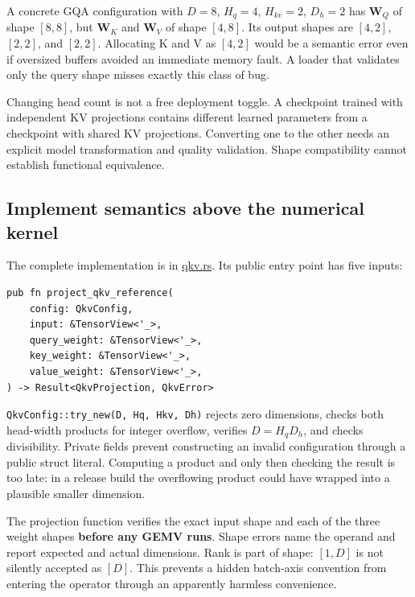 \documentclass[
  10pt,
]{article}
\begin{document}
A concrete GQA configuration with \(D=8\), \(H_q=4\), \(H_{kv}=2\),
\(D_h=2\) has \(\mathbf{W}_Q\) of shape \([8,8]\), but \(\mathbf{W}_K\)
and \(\mathbf{W}_V\) of shape \([4,8]\). Its output shapes are
\([4,2]\), \([2,2]\), and \([2,2]\). Allocating K and V as \([4,2]\)
would be a semantic error even if oversized buffers avoided an immediate
memory fault. A loader that validates only the query shape misses
exactly this class of bug.

Changing head count is not a free deployment toggle. A checkpoint
trained with independent KV projections contains different learned
parameters from a checkpoint with shared KV projections. Converting one
to the other needs an explicit model transformation and quality
validation. Shape compatibility cannot establish functional equivalence.

\subsection{Implement semantics above the numerical
kernel}\label{implement-semantics-above-the-numerical-kernel}

The complete implementation is in
\href{https://github.com/hermonai/inside-the-llm-engine/blob/astra-visual-rewrite/code/mini-engine/crates/engine0/src/qkv.rs}{qkv.rs}.
Its public entry point has five inputs:

\begin{verbatim}
pub fn project_qkv_reference(
    config: QkvConfig,
    input: &TensorView<'_>,
    query_weight: &TensorView<'_>,
    key_weight: &TensorView<'_>,
    value_weight: &TensorView<'_>,
) -> Result<QkvProjection, QkvError>
\end{verbatim}

\texttt{QkvConfig::try\_new(D,\ Hq,\ Hkv,\ Dh)} rejects zero dimensions,
checks both head-width products for integer overflow, verifies
\(D=H_qD_h\), and checks divisibility. Private fields prevent
constructing an invalid configuration through a public struct literal.
Computing a product and only then checking the result is too late: in a
release build the overflowing product could have wrapped into a
plausible smaller dimension.

The projection function verifies the exact input shape and each of the
three weight shapes \textbf{before any GEMV runs}. Shape errors name the
operand and report expected and actual dimensions. Rank is part of
shape: \([1,D]\) is not silently accepted as \([D]\). This prevents a
hidden batch-axis convention from entering the operator through an
apparently harmless convenience.
\end{document}
